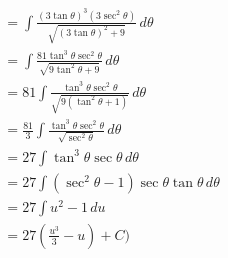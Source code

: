 \documentclass[preview]{standalone}
\begin{document}
\begin{align*}
&= \int \frac{(3\tan\theta)^3(3\sec^2\theta)}{\sqrt{(3\tan\theta)^2+9}} \, d\theta \\ &= \int \frac{81\tan^3\theta\sec^2\theta}{\sqrt{9\tan^2\theta+9}} \, d\theta \\ &= 81\int \frac{\tan^3\theta\sec^2\theta}{\sqrt{9(\tan^2\theta+1)}} \, d\theta \\ &= \frac{81}{3}\int \frac{\tan^3\theta\sec^2\theta}{\sqrt{\sec^2\theta}} \, d\theta \\ &= 27\int \tan^3\theta\sec\theta \, d\theta \\ &= 27\int (\sec^2\theta-1)\sec\theta\tan\theta \, d\theta \\ &=27\int u^2-1 \, du \\ &=27(\frac{u^3}{3}-u)+C)
\end{align*}
\end{document}
